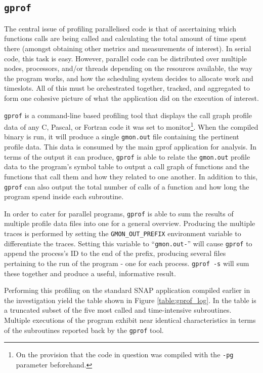 \documentclass[conference]{IEEEtran}
\begin{document}
\subsection{\texttt{gprof}}

The central issue of profiling parallelised code is that of ascertaining which functions calls are being called and calculating the total amount of time spent there (amongst obtaining other metrics and measurements of interest). In serial code, this task is easy. However, parallel code can be distributed over multiple nodes, processors, and/or threads depending on the resources available, the way the program works, and how the scheduling system decides to allocate work and timeslots. All of this must be orchestrated together, tracked, and aggregated to form one cohesive picture of what the application did on the execution of interest.

\texttt{gprof} is a command-line based profiling tool that displays the call graph profile data of any C, Pascal, or Fortran code it was set to monitor\footnote{On the provision that the code in question was compiled with the \texttt{-pg} parameter beforehand.}. When the compiled binary is run, it will produce a single \texttt{gmon.out} file containing the pertinent profile data. This data is consumed by the main gprof application for analysis. In terms of the output it can produce, \texttt{gprof} is able to relate the \texttt{gmon.out} profile data to the program's symbol table to output a call graph of functions and the functions that call them and how they related to one another. In addition to this, \texttt{gprof} can also output the total number of calls of a function and how long the program spend inside each subroutine.

In order to cater for parallel programs, \texttt{gprof} is able to sum the results of multiple profile data files into one for a general overview. Producing the multiple traces is performed by setting the \texttt{GMON\_OUT\_PREFIX} environment variable to differentiate the traces. Setting this variable to ``\texttt{gmon.out-}'' will cause \texttt{gprof} to append the process's ID to the end of the prefix, producing several files pertaining to the run of the program - one for each process. \texttt{gprof -s} will sum these together and produce a useful, informative result.

Performing this profiling on the standard SNAP application compiled earlier in the investigation yield the table shown in Figure \ref{table:gprof_log}. In the table is a truncated subset of the five most called and time-intensive subroutines. Multiple executions of the program exhibit near identical characteristics in terms of the subroutines reported back by the \texttt{gprof} tool.
\end{document}
